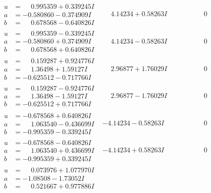 \documentclass[1p]{elsarticle_modified}
\theoremstyle{definition}
\begin{document}
$$\begin{array}{c|c|c}
\begin{aligned}
u &= \phantom{-}0.995359 + 0.339245 I \\
a &= -0.580860 - 0.374909 I \\
b &= \phantom{-}0.678568 - 0.640826 I\end{aligned}
 & \phantom{-}4.14234 + 0.58263 I & \phantom{-0.000000 } 0 \\ \hline\begin{aligned}
u &= \phantom{-}0.995359 - 0.339245 I \\
a &= -0.580860 + 0.374909 I \\
b &= \phantom{-}0.678568 + 0.640826 I\end{aligned}
 & \phantom{-}4.14234 - 0.58263 I & \phantom{-0.000000 } 0 \\ \hline\begin{aligned}
u &= \phantom{-}0.159287 + 0.924776 I \\
a &= \phantom{-}1.36498 + 1.59127 I \\
b &= -0.625512 - 0.717766 I\end{aligned}
 & \phantom{-}2.96877 + 1.76029 I & \phantom{-0.000000 } 0 \\ \hline\begin{aligned}
u &= \phantom{-}0.159287 - 0.924776 I \\
a &= \phantom{-}1.36498 - 1.59127 I \\
b &= -0.625512 + 0.717766 I\end{aligned}
 & \phantom{-}2.96877 - 1.76029 I & \phantom{-0.000000 } 0 \\ \hline\begin{aligned}
u &= -0.678568 + 0.640826 I \\
a &= \phantom{-}1.063540 - 0.436699 I \\
b &= -0.995359 - 0.339245 I\end{aligned}
 & -4.14234 - 0.58263 I & \phantom{-0.000000 } 0 \\ \hline\begin{aligned}
u &= -0.678568 - 0.640826 I \\
a &= \phantom{-}1.063540 + 0.436699 I \\
b &= -0.995359 + 0.339245 I\end{aligned}
 & -4.14234 + 0.58263 I & \phantom{-0.000000 } 0 \\ \hline\begin{aligned}
u &= \phantom{-}0.073976 + 1.077970 I \\
a &= -1.08508 - 1.73052 I \\
b &= \phantom{-}0.521667 + 0.977886 I\end{aligned}

\end{array}$$
\end{document}
